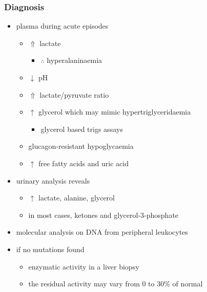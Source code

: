 \documentclass[12pt]{scrartcl}
\begin{document}
\subsubsection{Diagnosis}
\label{sec:org2b44696}
\begin{itemize}
\item plasma during acute episodes
\begin{itemize}
\item \(\Uparrow\) lactate
\begin{itemize}
\item \(\therefore\) hyperalaninaemia
\end{itemize}
\item \(\downarrow\) pH
\item \(\Uparrow\) lactate/pyruvate ratio
\item \(\uparrow\) glycerol which may mimic hypertriglyceridaemia
\begin{itemize}
\item glycerol based trigs assays
\end{itemize}
\item glucagon-resistant hypoglycaemia
\item \(\uparrow\) free fatty acids and uric acid
\end{itemize}
\item urinary analysis reveals
\begin{itemize}
\item \(\uparrow\) lactate, alanine, glycerol
\item in most cases, ketones and glycerol-3-phosphate
\end{itemize}

\item molecular analysis on DNA from peripheral leukocytes
\item if no mutations found
\begin{itemize}
\item enzymatic activity in a liver biopsy
\item the residual activity may vary from 0 to 30\% of normal
\end{itemize}
\end{itemize}
\end{document}
